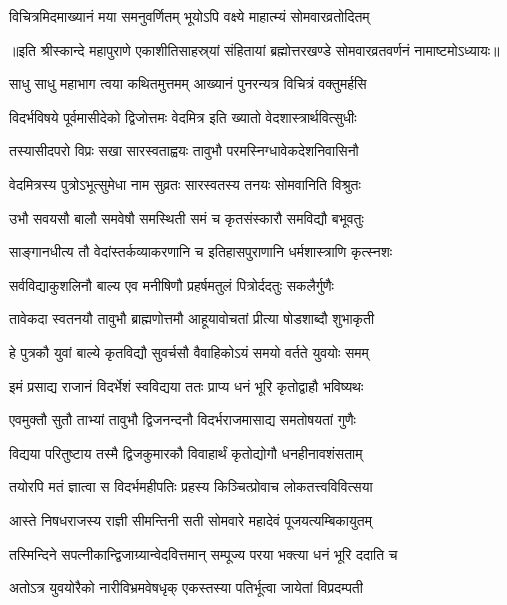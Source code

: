 \twolineshloka
{विचित्रमिदमाख्यानं मया समनुवर्णितम्}
{भूयोऽपि वक्ष्ये माहात्म्यं सोमवारव्रतोदितम्} %

{॥इति श्रीस्कान्दे महापुराणे एकाशीतिसाहस्र्यां संहितायां ब्रह्मोत्तरखण्डे सोमवारव्रतवर्णनं नामाष्टमोऽध्यायः॥}



\resetShloka

\twolineshloka
{साधु साधु महाभाग त्वया कथितमुत्तमम्}
{आख्यानं पुनरन्यत्र विचित्रं वक्तुमर्हसि} %

\twolineshloka
{विदर्भविषये पूर्वमासीदेको द्विजोत्तमः}
{वेदमित्र इति ख्यातो वेदशास्त्रार्थवित्सुधीः} %

\twolineshloka
{तस्यासीदपरो विप्रः सखा सारस्वताह्वयः}
{तावुभौ परमस्निग्धावेकदेशनिवासिनौ} %

\twolineshloka
{वेदमित्रस्य पुत्रोऽभूत्सुमेधा नाम सुव्रतः}
{सारस्वतस्य तनयः सोमवानिति विश्रुतः} %

\twolineshloka
{उभौ सवयसौ बालौ समवेषौ समस्थिती}
{समं च कृतसंस्कारौ समविद्यौ बभूवतुः} %

\twolineshloka
{साङ्गानधीत्य तौ वेदांस्तर्कव्याकरणानि च}
{इतिहासपुराणानि धर्मशास्त्राणि कृत्स्नशः} %

\twolineshloka
{सर्वविद्याकुशलिनौ बाल्य एव मनीषिणौ}
{प्रहर्षमतुलं पित्रोर्ददतुः सकलैर्गुणैः} %

\twolineshloka
{तावेकदा स्वतनयौ तावुभौ ब्राह्मणोत्तमौ}
{आहूयावोचतां प्रीत्या षोडशाब्दौ शुभाकृती} %

\twolineshloka
{हे पुत्रकौ युवां बाल्ये कृतविद्यौ सुवर्चसौ}
{वैवाहिकोऽयं समयो वर्तते युवयोः समम्} %

\twolineshloka
{इमं प्रसाद्य राजानं विदर्भेशं स्वविद्यया}
{ततः प्राप्य धनं भूरि कृतोद्वाहौ भविष्यथः} %

\twolineshloka
{एवमुक्तौ सुतौ ताभ्यां तावुभौ द्विजनन्दनौ}
{विदर्भराजमासाद्य समतोषयतां गुणैः} %

\twolineshloka
{विद्यया परितुष्टाय तस्मै द्विजकुमारकौ}
{विवाहार्थं कृतोद्योगौ धनहीनावशंसताम्} %

\twolineshloka
{तयोरपि मतं ज्ञात्वा स विदर्भमहीपतिः}
{प्रहस्य किञ्चित्प्रोवाच लोकतत्त्वविवित्सया} %

\twolineshloka
{आस्ते निषधराजस्य राज्ञी सीमन्तिनी सती}
{सोमवारे महादेवं पूजयत्यम्बिकायुतम्} %

\twolineshloka
{तस्मिन्दिने सपत्नीकान्द्विजाग्र्यान्वेदवित्तमान्}
{सम्पूज्य परया भक्त्या धनं भूरि ददाति च} %

\twolineshloka
{अतोऽत्र युवयोरैको नारीविभ्रमवेषधृक्}
{एकस्तस्या पतिर्भूत्वा जायेतां विप्रदम्पती} %


